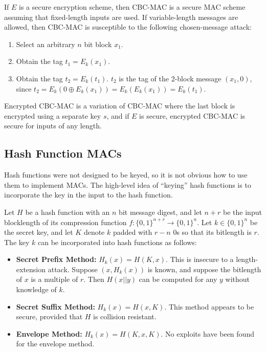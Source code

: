\documentclass[12pt,titlepage]{article}
\begin{document}
      If $E$ is a secure encryption scheme, then CBC-MAC is a secure MAC scheme assuming that fixed-length inputs are used. If variable-length messages are allowed, then
      CBC-MAC is susceptible to the following chosen-message attack:
      \begin{enumerate}
        \item Select an arbitrary $n$ bit block $x_1$.
        \item Obtain the tag $t_1 = E_k(x_1)$.
        \item Obtain the tag $t_2 = E_k(t_1)$. $t_2$ is the tag of the 2-block message $(x_1, 0)$, since $t_2 = E_k(0 \oplus E_k(x_1)) = E_k(E_k(x_1)) = E_k(t_1)$.
      \end{enumerate}

      Encrypted CBC-MAC is a variation of CBC-MAC where the last block is encrypted using a separate key $s$, and if $E$ is secure, encrypted CBC-MAC is secure for
      inputs of any length.

    \subsection{Hash Function MACs}
      Hash functions were not designed to be keyed, so it is not obvious how to use them to implement MACs. The high-level idea of ``keying'' hash functions is to
      incorporate the key in the input to the hash function.

      Let $H$ be a hash function with an $n$ bit message digest, and let $n + r$ be the input blocklength of its compression function $f: \{0, 1\}^{n+r} \rightarrow \{0, 1\}^n$.
      Let $k \in \{0, 1\}^n$ be the secret key, and let $K$ denote $k$ padded with $r - n$ 0s so that its bitlength is $r$. The key $k$ can be incorporated into hash functions
      as follows:

      \begin{itemize}
        \item \textbf{Secret Prefix Method:} $H_k(x) = H(K, x)$. This is insecure to a length-extension attack. Suppose $(x, H_k(x))$ is known, and suppose the bitlength of $x$
          is a multiple of $r$. Then $H(x || y)$ can be computed for any $y$ without knowledge of $k$.
        \item \textbf{Secret Suffix Method:} $H_k(x) = H(x, K)$. This method appears to be secure, provided that $H$ is collision resistant.
        \item \textbf{Envelope Method:} $H_k(x) = H(K, x, K)$. No exploits have been found for the envelope method.
      \end{itemize}
\end{document}
